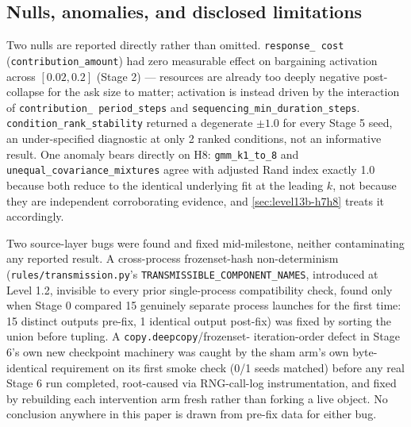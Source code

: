 \subsection{Nulls, anomalies, and disclosed limitations}
\label{sec:level13b-limitations}

Two nulls are reported directly rather than omitted. \texttt{response\_%
cost} (\texttt{contribution\_amount}) had zero measurable effect on
bargaining activation across $[0.02, 0.2]$ (Stage 2) --- resources are
already too deeply negative post-collapse for the ask size to matter;
activation is instead driven by the interaction of \texttt{contribution\_%
period\_steps} and \texttt{sequencing\_min\_duration\_steps}.
\texttt{condition\_rank\_stability} returned a degenerate $\pm1.0$ for
every Stage 5 seed, an under-specified diagnostic at only 2 ranked
conditions, not an informative result. One anomaly bears directly on H8:
\texttt{gmm\_k1\_to\_8} and \texttt{unequal\_covariance\_mixtures} agree
with adjusted Rand index exactly 1.0 because both reduce to the identical
underlying fit at the leading $k$, not because they are independent
corroborating evidence, and \cref{sec:level13b-h7h8} treats it accordingly.

Two source-layer bugs were found and fixed mid-milestone, neither
contaminating any reported result. A cross-process frozenset-hash
non-determinism (\texttt{rules/transmission.py}'s
\texttt{TRANSMISSIBLE\_COMPONENT\_NAMES}, introduced at Level 1.2, invisible
to every prior single-process compatibility check, found only when Stage
0 compared 15 genuinely separate process launches for the first time: 15
distinct outputs pre-fix, 1 identical output post-fix) was fixed by
sorting the union before tupling. A \texttt{copy.deepcopy}/frozenset-
iteration-order defect in Stage 6's own new checkpoint machinery was
caught by the sham arm's own byte-identical requirement on its first smoke
check (0/1 seeds matched) before any real Stage 6 run completed, root-caused
via RNG-call-log instrumentation, and fixed by rebuilding each intervention
arm fresh rather than forking a live object. No conclusion anywhere in
this paper is drawn from pre-fix data for either bug.

